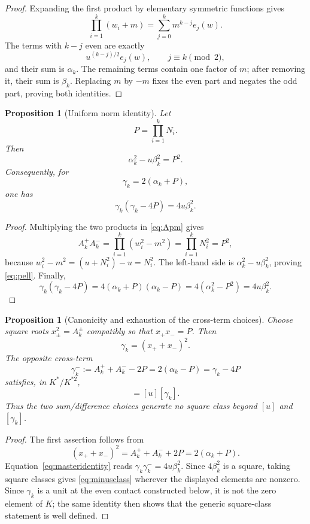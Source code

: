 \documentclass[11pt,a4paper]{article}
\newtheorem{proposition}[theorem]{Proposition}
\theoremstyle{definition}
\theoremstyle{remark}
\newcommand{\gammam}{\gamma_k^{-}}
\begin{document}
\begin{proof}
Expanding the first product by elementary symmetric functions gives
\[
 \prod_{i=1}^k(w_i+m)
 =\sum_{j=0}^k m^{k-j}e_j(w).
\]
The terms with $k-j$ even are exactly
\[
 u^{(k-j)/2}e_j(w),\qquad j\equiv k\pmod2,
\]
and their sum is $\alpha_k$.  The remaining terms contain one factor of $m$;
after removing it, their sum is $\beta_k$.  Replacing $m$ by $-m$ fixes the
even part and negates the odd part, proving both identities.
\end{proof}

\begin{proposition}[Uniform norm identity]
\label{prop:normidentity}
Let
\[
 P=\prod_{i=1}^kN_i.
\]
Then
\begin{equation}
 \alpha_k^2-u\beta_k^2=P^2.
 \label{eq:pell}
\end{equation}
Consequently, for
\begin{equation}
 \gamma_k=2(\alpha_k+P),
 \label{eq:gamma}
\end{equation}
one has
\begin{equation}
 \boxed{\gamma_k(\gamma_k-4P)=4u\beta_k^2.}
 \label{eq:masteridentity}
\end{equation}
\end{proposition}

\begin{proof}
Multiplying the two products in \eqref{eq:Apm} gives
\[
 A_k^+A_k^-
 =\prod_{i=1}^k(w_i^2-m^2)
 =\prod_{i=1}^kN_i^2
 =P^2,
\]
because $w_i^2-m^2=(u+N_i^2)-u=N_i^2$.  The left-hand side is
$\alpha_k^2-u\beta_k^2$, proving \eqref{eq:pell}.  Finally,
\[
 \gamma_k(\gamma_k-4P)
 =4(\alpha_k+P)(\alpha_k-P)
 =4(\alpha_k^2-P^2)
 =4u\beta_k^2.
\]
\end{proof}

\begin{proposition}[Canonicity and exhaustion of the cross-term choices]
\label{prop:canonicity}
Choose square roots $x_\pm^2=A_k^\pm$ compatibly so that $x_+x_-=P$.
Then
\[
 \gamma_k=(x_++x_-)^2.
\]
The opposite cross-term
\[
 \gammam:=A_k^++A_k^--2P=2(\alpha_k-P)=\gamma_k-4P
\]
satisfies, in $K^*/K^{*2}$,
\begin{equation}
 [\gammam]=[u][\gamma_k].
 \label{eq:minusclass}
\end{equation}
Thus the two sum/difference choices generate no square class beyond
$[u]$ and $[\gamma_k]$.
\end{proposition}

\begin{proof}
The first assertion follows from
\[
 (x_++x_-)^2=A_k^++A_k^-+2P=2(\alpha_k+P).
\]
Equation~\eqref{eq:masteridentity} reads
$\gamma_k\gammam=4u\beta_k^2$.  Since $4\beta_k^2$ is a square, taking
square classes gives \eqref{eq:minusclass} wherever the displayed elements
are nonzero.  Since $\gamma_k$ is a unit at the even contact constructed
below, it is not the zero element of $K$; the same identity then shows that
the generic square-class statement is well defined.
\end{proof}
\end{document}
